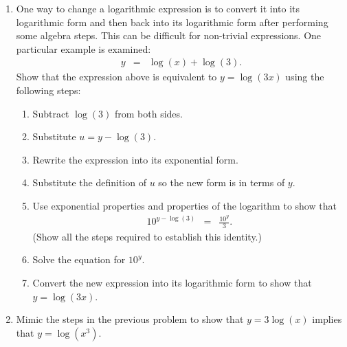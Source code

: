 \begin{enumerate}
\item One way to change a logarithmic expression is to convert it into
  its logarithmic form and then back into its logarithmic form after
  performing some algebra steps. This can be difficult for non-trivial
  expressions. One particular example is examined:
  \begin{eqnarray*}
    y & = & \log(x) + \log(3).
  \end{eqnarray*}
  Show that the expression above is equivalent to $y=\log(3x)$ using
  the following steps:
  \begin{enumerate}
  \item Subtract $\log(3)$ from both sides.
  \item Substitute $u=y-\log(3)$.
  \item Rewrite the expression into its exponential form.
  \item Substitute the definition of $u$ so the new form is in terms of $y$.
  \item Use exponential properties and properties of the logarithm to show that
    \begin{eqnarray*}
      10^{y-\log(3)} & = & \frac{10^y}{3}.
    \end{eqnarray*}
    (Show all the steps required to establish this identity.)
  \item Solve the equation for $10^y$.
  \item Convert the new expression into its logarithmic form to show
    that $y=\log(3x)$.
  \end{enumerate}

\item Mimic the steps in the previous problem to show that
  $y=3\log(x)$ implies that $y=\log\left(x^3\right)$.

\end{enumerate}

